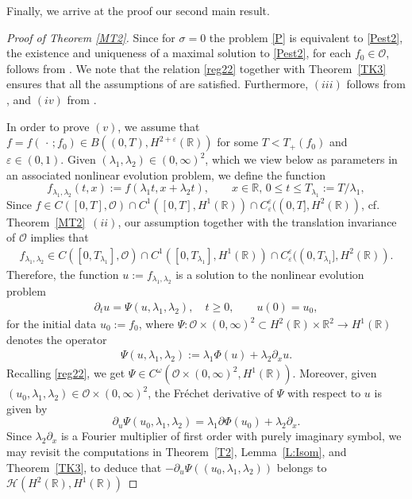 \documentclass[11pt,reqno]{amsart}
\numberwithin{equation}{section}
\newcommand{\0}{\Omega}
\newcommand{\e}{\varepsilon}
\newcommand{\p}{\partial}
\newcommand{\cO}{\mathcal{O}}
\newcommand{\kH}{\mathcal{H}}
\newcommand{\R}{\mathbb{R}}
\numberwithin{equation}{section}
\begin{document}
 
Finally, we arrive at the  proof our second main result.
\begin{proof}[Proof of Theorem \ref{MT2}] 
Since  for $\sigma=0$ the problem \eqref{P} is equivalent to \eqref{Pest2}, the existence and uniqueness of a maximal solution to \eqref{Pest2}, for each $f_0\in \cO$, follows from \cite[Theorem~8.1.1]{L95}. 
We note that the relation \eqref{reg22} together with Theorem~\ref{TK3} ensures that
all the assumptions of \cite[Theorem 8.1.1]{L95} are satisfied. 
Furthermore,  $(iii)$  follows  from  \cite[Proposition~8.2.3 and Theorem~8.3.9]{L95}, and $(iv)$ from \cite[Proposition~8.2.1]{L95}.

In order to prove $(v)$,  we assume that $f=f(\,\cdot\,; f_0)\in B((0,T), H^{2+\e}(\R))$ for some $T<T_+(f_0)$ and $\e\in(0,1).$
Given $(\lambda_1,\lambda_2)\in(0,\infty)^2$, which we view below as  parameters in an associated nonlinear evolution problem, we define    the function 
\[
f_{\lambda_1,\lambda_2}(t,x):=f(\lambda_1 t,x+\lambda_2 t), \qquad   x\in\R, \, 0\leq t\leq T_{\lambda_1}:=T/\lambda_1,
\]
Since $f\in C([0,T],\cO)\cap C^1([0,T], H^1(\R))\cap C^\e_\e((0,T], H^2(\R))$, cf. Theorem~\ref{MT2}~$(ii)$, our assumption together with the translation invariance of $\cO$ implies that
\begin{align}\label{IQ1}
 f_{\lambda_1,\lambda_2}\in C([0,T_{\lambda_1}],\cO)\cap C^1([0,T_{\lambda_1}], H^1(\R))\cap C^\e_\e((0,T_{\lambda_1}], H^2(\R)). 
\end{align}
Therefore,  the  function $u:=f_{\lambda_1,\lambda_2}$
is a solution to  the nonlinear  evolution problem  
\begin{align}\label{QC}
\p_tu= \Psi(u,\lambda_1,\lambda_2) ,\quad t\geq0,\qquad u(0)=u_0,
\end{align}
for the initial data $u_0:=f_0$, where $ \Psi:\cO\times (0,\infty)^2\subset H^2(\R)\times \R^2\to  H^1(\R)$ denotes the    operator  
\begin{align*}
  \Psi(u,\lambda_1,\lambda_2):=\lambda_1\Phi(u)+\lambda_2\p_x u.
\end{align*}
Recalling \eqref{reg22}, we get $\Psi\in C^\omega(\cO\times (0,\infty)^2,  H^1(\R))$.
Moreover, given $(u_0,\lambda_1,\lambda_2)\in \cO\times (0,\infty)^2$,
the Fr\'echet derivative of $\Psi$ with respect to $u$ is given by
\[
\p_u\Psi(u_0,\lambda_1,\lambda_2)=\lambda_1\p\Phi(u_0)+\lambda_2\p_x.
\]
Since $\lambda_2\p_x$ is a  Fourier multiplier of first order with purely imaginary symbol,
we may revisit the   computations in Theorem~\ref{T2}, Lemma~\ref{L:Isom}, and Theorem~\ref{TK3}, to deduce that   $-\p_u\Psi((u_0,\lambda_1,\lambda_2))$ belongs to $\kH(H^2(\R), H^1(\R))$

\end{proof}
\end{document}
